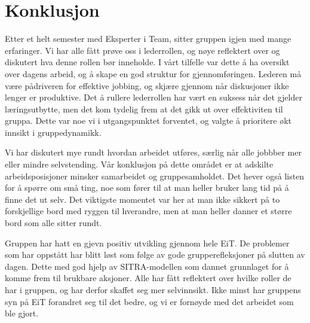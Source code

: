\chapter{Konklusjon}

Etter et helt semester med Eksperter i Team, sitter gruppen igjen med mange erfaringer. 
Vi har alle fått prøve oss i lederrollen, og nøye reflektert over og diskutert hva denne rollen bør inneholde. 
I vårt tilfelle var dette å ha oversikt over dagens arbeid, og å skape en god struktur for gjennomføringen. 
Lederen må være pådriveren for effektive jobbing, og skjære gjennom når diskusjoner ikke lenger er produktive. 
Det å rullere lederrollen har vært en suksess når det gjelder læringsutbytte, men det kom tydelig frem at det gikk ut over effektiviten til gruppa. 
Dette var noe vi i utgangspunktet forventet, og valgte å prioritere økt innsikt i gruppedynamikk.
\vspace{\secspace}

Vi har diskutert mye rundt hvordan arbeidet utføres, særlig når alle jobbber mer eller mindre selvstending. 
Vår konklusjon på dette området er at adskilte arbeidsposisjoner minsker samarbeidet og gruppesamholdet.
Det hever også listen for å spørre om små ting, noe som fører til at man heller bruker lang tid på å finne det ut selv. 
Det viktigste momentet var her at man ikke sikkert på to forskjellige bord med ryggen til hverandre, men at man heller danner et større bord som alle sitter rundt.
\vspace{\secspace}

Gruppen har hatt en gjevn positiv utvikling gjennom hele EiT. 
De problemer som har oppstått har blitt løst som følge av gode grupperefleksjoner på slutten av dagen. 
Dette med god hjelp av SITRA-modellen som dannet grunnlaget for å komme frem til brukbare aksjoner. 
Alle har fått reflektert over hvilke roller de har i gruppen, og har derfor skaffet seg mer selvinnsikt. 
Ikke minst har gruppens syn på EiT forandret seg til det bedre, og vi er fornøyde med det arbeidet som ble gjort. 